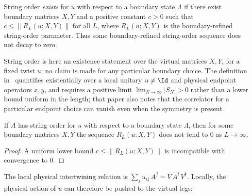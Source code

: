 \begin{definition}\label{def:has_string_order}
    \leanok
    String order \emph{exists} for $u$ with respect to a boundary
    state $\Lambda$ if there exist boundary matrices $X, Y$ and a
    positive constant $c > 0$ such that
    $c \le \|R_L(u;X,Y)\|$ for all $L$, where
    $R_L(u;X,Y)$ is the boundary-refined string-order parameter.
    Thus some boundary-refined string-order sequence does not decay to zero.

    String order is here an existence statement over the virtual matrices
    $X,Y$, for a fixed twist $u$; no claim is made for any particular
    boundary choice. The definition in~\cite{PerezGarcia2008StringOrder}
    quantifies existentially over a local unitary $u \ne \Id$ and physical
    endpoint operators $x,y$, and requires a positive limit
    $\lim_{N\to\infty}|S_N| > 0$ rather than a lower bound uniform in the
    length; that paper also notes that the correlator for a particular
    endpoint choice can vanish even when the symmetry is present.
\end{definition}

\begin{lemma}
    \label{lem:not_tendsto_zero_of_hasStringOrder}
    \leanok
    If $A$ has string order for $u$ with respect to a boundary state
    $\Lambda$, then for some boundary matrices $X,Y$ the sequence
    $R_L(u;X,Y)$ does not tend to $0$ as $L \to \infty$.
\end{lemma}

\begin{proof}
    \leanok
    A uniform lower bound $c \le \|R_L(u;X,Y)\|$ is incompatible with
    convergence to $0$.
\end{proof}

\begin{definition}\label{def:condC1}
    \leanok
    The local physical intertwining relation is
    $\sum_j u_{ij}\, A^j = V\, A^i\, V^\dagger$.
    Locally, the physical action of $u$ can therefore be pushed to the virtual
    legs:
    \begin{center}
    \end{center}
\end{definition}

